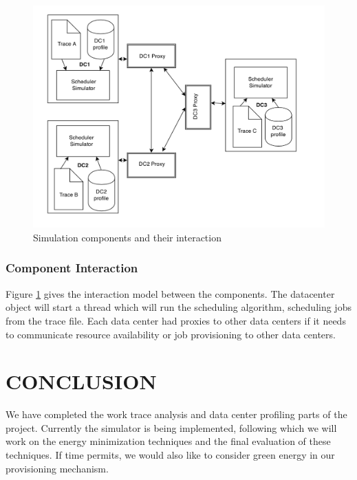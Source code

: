 \documentclass[letterpaper,twocolumn,12pt]{article}
\begin{document}
\begin{figure}[] 
\centering
\includegraphics[scale=0.40]{component}
\caption{Simulation components and their interaction}
\label{fig:component}
\end{figure}

\subsubsection{Component Interaction}
Figure \ref{fig:component} gives the interaction model between the components. The datacenter object will start a thread which will run the scheduling algorithm, scheduling jobs from the trace file. Each data center had proxies to other data centers if it needs to communicate resource availability or job provisioning to other data centers.

\section{CONCLUSION}
We have completed the work trace analysis and data center profiling parts of the project. Currently the simulator is being implemented, following which we will work on the energy minimization techniques and the final evaluation of these techniques. If time permits, we would also like to consider green energy in our provisioning mechanism. 

{\footnotesize 
}
\end{document}
